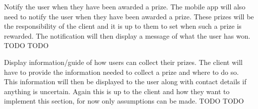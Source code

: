 \FuncReq
{Notify the user when they have been awarded a prize.}
{The mobile app will also need to notify the user when they have been awarded a prize. These prizes will be the responsibility of the client and it is up to them to set when such a prize is rewarded. The notification will then display a message of what the user has won.}
{TODO}
{TODO}

\FuncReq
{Display information/guide of how users can collect their prizes.}
{The client will have to provide the information needed to collect a prize and where to do so. This information will then be displayed to the user along with contact details if anything is uncertain. Again this is up to the client and how they want to implement this section, for now only assumptions can be made.}
{TODO}
{TODO}